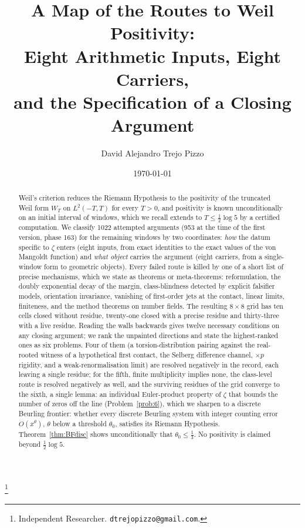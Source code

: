 \documentclass[11pt]{amsart}
\theoremstyle{definition}
\theoremstyle{remark}
\begin{document}
\title[A map of the routes to Weil positivity]
{A Map of the Routes to Weil Positivity:\\
Eight Arithmetic Inputs, Eight Carriers,\\
and the Specification of a Closing Argument}

\author{David Alejandro Trejo Pizzo}
\thanks{Independent Researcher. \texttt{dtrejopizzo@gmail.com}.}

\date{\today}

\begin{abstract}
Weil's criterion reduces the Riemann Hypothesis to the positivity of the truncated Weil form
$W_T$ on $L^2(-T,T)$ for every $T>0$, and positivity is known unconditionally on an initial
interval of windows, which we recall extends to $T\le\frac12\log5$ by a certified computation. We
classify 1022 attempted arguments (953 at the time of the first version, phase 163) for the remaining windows by two coordinates: \emph{how} the datum
specific to $\zeta$ enters (eight inputs, from exact identities to the exact values of the von
Mangoldt function) and \emph{what object} carries the argument (eight carriers, from a single-window
form to geometric objects). Every failed route is killed by one of a short list of precise
mechanisms, which we state as theorems or meta-theorems: reformulation, the doubly exponential decay
of the margin, class-blindness detected by explicit falsifier models, orientation invariance,
vanishing of first-order jets at the contact, linear limits, finiteness, and the method theorems on
number fields. The resulting $8\times8$ grid has ten cells closed without residue, twenty-one closed with
a precise residue and thirty-three with a live residue. Reading the walls backwards gives twelve
necessary conditions on any closing argument; we rank the unpainted directions and state the
highest-ranked ones as six problems. Four of them (a torsion-distribution pairing against the real-rooted witness of a
hypothetical first contact, the Selberg difference channel, $\times p$ rigidity, and a weak-renormalisation
limit) are resolved negatively in the record, each leaving a single residue; for the fifth, finite
multiplicity implies none, the class-level route is resolved negatively as well, and the surviving residues
of the grid converge to the sixth, a single lemma: an individual Euler-product property of $\zeta$ that bounds the
number of zeros off the line (Problem~\ref{prob:6}), which we sharpen to a discrete Beurling frontier: whether every discrete Beurling system with integer counting error $O(x^\theta)$, $\theta$ below a threshold $\theta_0$, satisfies its Riemann Hypothesis. Theorem~\ref{thm:BFdisc} shows unconditionally that $\theta_0\le\frac13$. No positivity is claimed beyond $\frac12\log5$.
\end{abstract}
\end{document}
